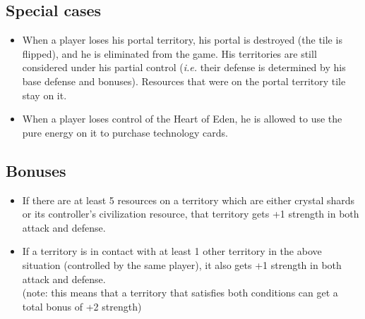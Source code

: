 \documentclass[a4paper]{article}
\begin{document}
    \subsection{Special cases}
        \begin{itemize}
            \item When a player loses his portal territory,
                     his portal is destroyed (the tile is flipped),
                     and he is eliminated from the game.
                     His territories are still considered under his partial control
                     (\textit{i.e. } their defense is determined by his base defense
                     and bonuses).
                     Resources that were on the portal territory tile stay on it.
            \item When a player loses control of the Heart of Eden,
                     he is allowed to use the pure energy on it to purchase technology cards.
        \end{itemize}
        
\newpage
    \subsection{Bonuses}
        \begin{itemize}
            \item If there are at least 5 resources on a territory which are either
                crystal shards or its controller's civilization resource,
                that territory gets +1 strength in both attack and defense.
            \item If a territory is in contact with at least 1 other territory
                in the above situation (controlled by the same player),
                it also gets +1 strength in both attack and defense.\\
                (note: this means that a territory that satisfies both conditions
                can get a total bonus of +2 strength)
        \end{itemize}
        
\end{document}
